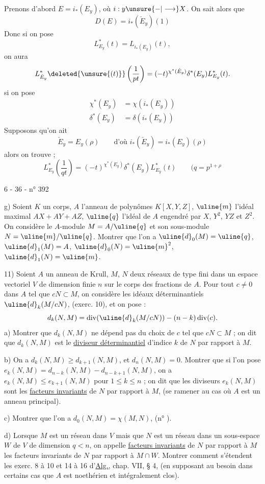 Prenons d'abord $E=i_*(E_y)$, où $i:y\unsure{-|\longrightarrow}X$.
On sait alors que
\[
D(E)=i_*(\check E_y)(1)
\]
 Donc si on pose
\[
L^*_{E_y}(t)=L_{i_*(E_y)}(t),
\]
on aura
\[
L^*_{\check E_y}\deleted{\unsure{(t)}}\left(\frac1{pt}\right)=(-t)^{\chi^*(\check E_y)}\delta^*(E_y)L^*_{E_y}(t).
\]
si on pose
\[
\begin{aligned}
\chi^*(E_y)&=\chi(i_*(E_y))\\
\delta^*(E_y)&=\delta(i_*(E_y))
\end{aligned}
\]
Supposons qu'on ait
\[
\check E_y=E_y(\rho)\qquad\text{d'où }i_*(\check E_y)=i_*(E_y)(\rho)
\]
alors on trouve ;
\[
\boxed{L^*_{E_y}\left(\frac1{qt}\right)=(-t)^{\chi^*(E_y)}\delta^*(E_y)L^*_{E_y}(t)}
\qquad(q=p^{1+\rho}
\]
\begin{center}6 - 36 - \hfill n° 392\end{center}
g) Soient $K$ un corps, $A$ l'anneau de polynômes $K[X,Y,Z]$, $\uline{m}$ l'idéal maximal $AX+AY+AZ$, $\uline{q}$ l'idéal de $A$ engendré par $X$, $Y^2$, $YZ$ et $Z^2$. On considère le $A$-module $M=A/\uline{q}$ et son sous-module $N=\uline{m}/\uline{q}$. Montrer que l'on a $\uline{d}_0(M)=\uline{q}$, $\uline{d}_1(M)=A$, $\uline{d}_0(N)=\uline{m}^2$, $\uline{d}_1(N)=\uline{m}$.

11) Soient $A$ un anneau de Krull, $M$, $N$ deux réseaux de type fini dans un espace vectoriel $V$ de dimension finie $n$ sur le corps des fractions de $A$. Pour tout $c\ne0$ dans $A$ tel que $cN\subset M$, on considère les idéaux déterminantiels $\uline{d}_k(M/cN)$, (exerc. 10), et on pose :
\[
d_k(N,M)=\operatorname{div}(\uline{d}_k(M/cN))-(n-k)\operatorname{div}(c).
\]
a) Montrer que $d_k(N,M)$ ne dépend pas du choix de $c$ tel que $cN\subset M$ ; on dit que $d_k(N,M)$ est le \uline{diviseur déterminantiel} d'indice $k$ de $N$ par rapport à $M$.

b) On a $d_k(N,M)\ge d_{k+1}(N,M)$, et $d_n(N,M)=0$. Montrer que si l'on pose $e_k(N,M)=d_{n-k}(N,M)-d_{n-k+1}(N,M)$, on a $e_k(N,M)\le e_{k+1}(N,M)$ pour $1\le k\le n$ ; on dit que les diviseurs $e_k(N,M)$ sont les \uline{facteurs invariants} de $N$ par rapport à $M$, (se ramener au cas où $A$ est un anneau principal).

c) Montrer que l'on a $d_0(N,M)=\chi(M,N)$, (n° \quad).

d) Lorsque $M$ est un réseau dans $V$ mais que $N$ est un réseau dans un sous-espace $W$ de $V$ de dimension $q<n$, on appelle \uline{facteurs invariants} de $N$ par rapport à $M$ les facteurs invariants de $N$ par rapport à $M\cap W$. Montrer comment s'étendent les exerc. 8 à 10 et 14 à 16 d'\uline{Alg.}, chap. VII, § 4, (en supposant au besoin dans certains cas que $A$ est noethérien et intégralement clos).

